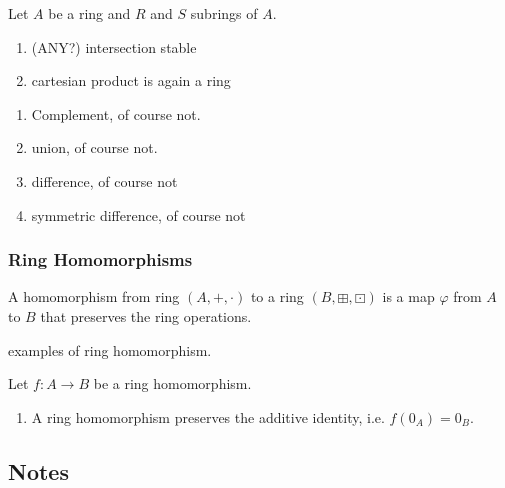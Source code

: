 %
%
%
\begin{thmbox}
    \begin{proposition}
        Let \(A\) be a ring and \(R\) and \(S\) subrings of \(A\).
        \begin{enumerate}
            \item (ANY?) intersection stable
            \item cartesian product is again a ring
        \end{enumerate}
    \end{proposition}
\end{thmbox}
%
%
%
\begin{exmbox}
    \begin{example}
        \begin{enumerate}
            \item Complement, of course not.
            \item union, of course not.
            \item difference, of course not
            \item symmetric difference, of course not
        \end{enumerate}
    \end{example}
\end{exmbox}

\subsubsection*{Ring Homomorphisms}
\begin{defbox}
    \begin{definition}
        A homomorphism from ring \((A, +, \cdot)\) to a ring \((B, \boxplus, \boxdot)\) is a map \(\varphi\) from \(A\) to \(B\) that preserves the ring operations.
    \end{definition}
\end{defbox}
%
%
%
\begin{example}
    examples of ring homomorphism.
\end{example}
%
%
%
\begin{thmbox}
    \begin{proposition}
        Let \(f: A \rightarrow B\) be a ring homomorphism.
        \begin{enumerate}
            \item A ring homomorphism preserves the additive identity, i.e. \(f(0_A) = 0_B\).
        \end{enumerate}
    \end{proposition}
\end{thmbox}
\newpage
\subsection*{Notes}

